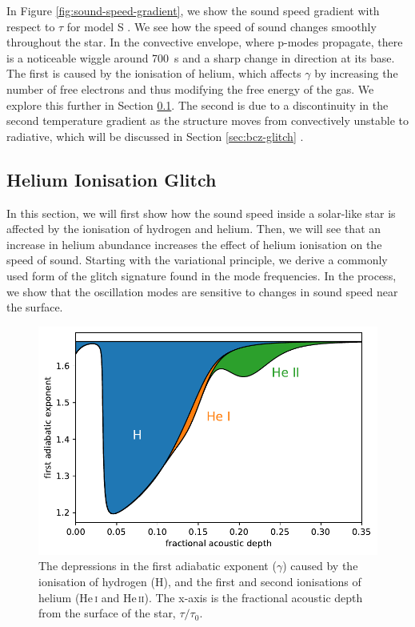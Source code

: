 In Figure \ref{fig:sound-speed-gradient}, we show the sound speed gradient with respect to \(\tau\) for model S . We see how the speed of sound changes smoothly throughout the star. In the convective envelope, where p-modes propagate, there is a noticeable wiggle around \SI{700}{\second} and a sharp change in direction at its base. The first is caused by the ionisation of helium, which affects \(\gamma\) by increasing the number of free electrons and thus modifying the free energy of the gas. We explore this further in Section \ref{sec:helium-glitch}. The second is due to a discontinuity in the second temperature gradient as the structure moves from convectively unstable to radiative, which will be discussed in Section \ref{sec:bcz-glitch} .

\subsection{Helium Ionisation Glitch}\label{sec:helium-glitch}

In this section, we will first show how the sound speed inside a solar-like star is affected by the ionisation of hydrogen and helium. Then, we will see that an increase in helium abundance increases the effect of helium ionisation on the speed of sound. Starting with the variational principle, we derive a commonly used form of the glitch signature found in the mode frequencies. In the process, we show that the oscillation modes are sensitive to changes in sound speed near the surface.

\begin{figure}[!tbp]
    \centering
    \includegraphics{figures/adiabatic-ionisation-regions.pdf}
    \caption{The depressions in the first adiabatic exponent (\(\gamma\)) caused by the ionisation of hydrogen (H), and the first and second ionisations of helium (He\,\textsc{i} and He\,\textsc{ii}). The x-axis is the fractional acoustic depth from the surface of the star, \(\tau/\tau_0\).}
    \label{fig:gamma-zones}
\end{figure}

